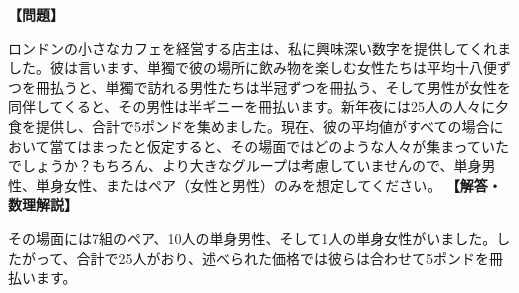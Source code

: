 \documentclass[10pt,a4paper,oneside,openany]{ltjsbook}
\begin{document}
\begin{tcolorbox}[colback=softblue,colframe=primaryblue,title=\textbf{第 19 問：新年夜の夕食会 （原題: THE NEW YEAR'S EVE SUPPERS.）},arc=2mm,boxrule=1pt,breakable]
\textbf{【問題】}\par\vspace{0.3em}
ロンドンの小さなカフェを経営する店主は、私に興味深い数字を提供してくれました。彼は言います、単獨で彼の場所に飲み物を楽しむ女性たちは平均十八便ずつを冊払うと、単獨で訪れる男性たちは半冠ずつを冊払う、そして男性が女性を同伴してくると、その男性は半ギニーを冊払います。新年夜には25人の人々に夕食を提供し、合計で5ポンドを集めました。現在、彼の平均値がすべての場合において當てはまったと仮定すると、その場面ではどのような人々が集まっていたでしょうか？もちろん、より大きなグループは考慮していませんので、単身男性、単身女性、またはペア（女性と男性）のみを想定してください。
\tcblower
\textbf{【解答・数理解説】}\par\vspace{0.3em}
その場面には7組のペア、10人の単身男性、そして1人の単身女性がいました。したがって、合計で25人がおり、述べられた価格では彼らは合わせて5ポンドを冊払います。
\end{tcolorbox}
\end{document}
